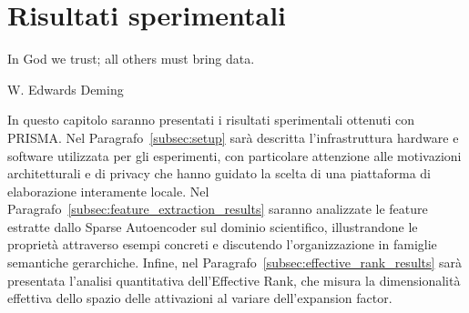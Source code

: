 \section{Risultati sperimentali}
\label{sec:06_risultati}

\epigraph{
    In God we trust; all others must bring data.
}{W. Edwards Deming}

In questo capitolo saranno presentati i risultati sperimentali ottenuti con PRISMA. Nel Paragrafo~\ref{subsec:setup} sarà descritta l'infrastruttura hardware e software utilizzata per gli esperimenti, con particolare attenzione alle motivazioni architetturali e di privacy che hanno guidato la scelta di una piattaforma di elaborazione interamente locale. Nel Paragrafo~\ref{subsec:feature_extraction_results} saranno analizzate le feature estratte dallo Sparse Autoencoder sul dominio scientifico, illustrandone le proprietà attraverso esempi concreti e discutendo l'organizzazione in famiglie semantiche gerarchiche. Infine, nel Paragrafo~\ref{subsec:effective_rank_results} sarà presentata l'analisi quantitativa dell'Effective Rank, che misura la dimensionalità effettiva dello spazio delle attivazioni al variare dell'expansion factor.

\newpage

